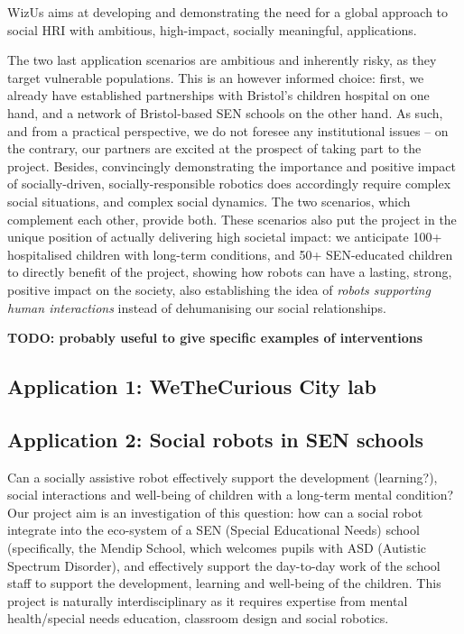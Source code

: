 \documentclass[11pt]{report}
\newcommand{\project}{WizUs\xspace}
\newcommand{\TODO}[1]{{\color{red}\textbf{TODO: #1}}}
\begin{document}
\project aims at developing and demonstrating the need for a global approach to
social HRI with ambitious, high-impact, socially meaningful, applications.

The two last application scenarios are ambitious and inherently risky, as they
target vulnerable populations. This is an however informed choice: first, we
already have established partnerships with Bristol's children hospital on one
hand, and a network of Bristol-based SEN schools on the other hand. As such, and
from a practical perspective, we do not foresee any institutional issues -- on
the contrary, our partners are excited at the prospect of taking part to the
project. Besides, convincingly demonstrating the importance and positive impact
of socially-driven, socially-responsible robotics does accordingly require
complex social situations, and complex social dynamics. The two scenarios, which
complement each other, provide both. These scenarios also put the project in the
unique position of actually delivering high societal impact: we anticipate 100+
hospitalised children with long-term conditions, and 50+ SEN-educated children
to directly benefit of the project, showing how robots can have a lasting,
strong, positive impact on the society, also establishing the idea of
\emph{robots supporting human interactions} instead of dehumanising our social
relationships.


\TODO{probably useful to give specific examples of interventions}

\subsection{Application 1: WeTheCurious City lab}

\subsection{Application 2: Social robots in SEN schools}

Can a socially assistive robot effectively support the development (learning?),
social interactions and well-being of children with a long-term mental
condition? Our project aim is an investigation of this question: how can a
social robot integrate into the eco-system of a SEN (Special Educational Needs)
school (specifically, the Mendip School, which welcomes pupils with ASD
(Autistic Spectrum Disorder), and effectively support the day-to-day work of the
school staff to support the development, learning and well-being of the
children. This project is naturally interdisciplinary as it requires expertise
from mental health/special needs education, classroom design and social
robotics. 
\end{document}
